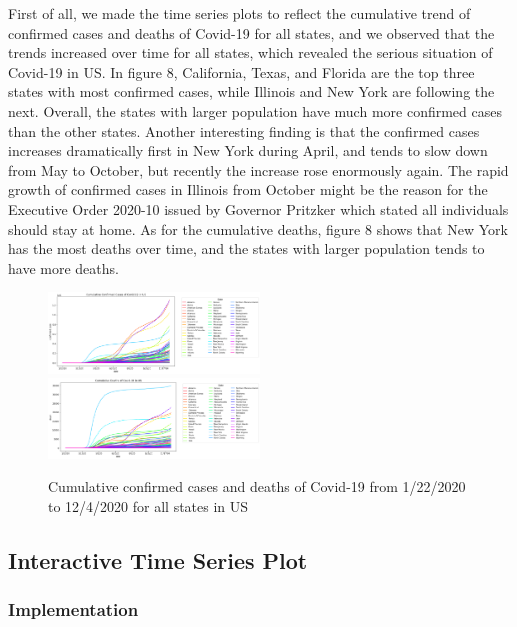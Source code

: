 \documentclass{article}
\begin{document}
First of all, we made the time series plots to reflect the cumulative trend of confirmed cases and deaths of Covid-19 for all states, and we observed that the trends increased over time for all states, which revealed the serious situation of Covid-19 in US. In figure 8, California, Texas, and Florida are the top three states with most confirmed cases, while Illinois and New York are following the next. Overall, the states with larger population have much more confirmed cases than the other states. Another interesting finding is that the confirmed cases increases dramatically first in New York during April, and tends to slow down from May to October, but recently the increase rose enormously again. The rapid growth of confirmed cases in Illinois from October might be the reason for the Executive Order 2020-10 issued by Governor Pritzker which stated all individuals should stay at home. As for the cumulative deaths, figure 8 shows that New York has the most deaths over time, and the states with larger population tends to have more deaths.





\begin{figure}[htp]
\centering
\includegraphics[width=0.5\textwidth]{cum_confirmed2.png}\hfill
\includegraphics[width=0.5\textwidth]{cum_death2.png}
\caption{Cumulative confirmed cases and deaths of Covid-19 from 1/22/2020 to 12/4/2020 for all states in US}
\label{fig:figure}

\end{figure}
\FloatBarrier




\subsection{Interactive Time Series Plot}

\subsubsection{Implementation}
\end{document}
